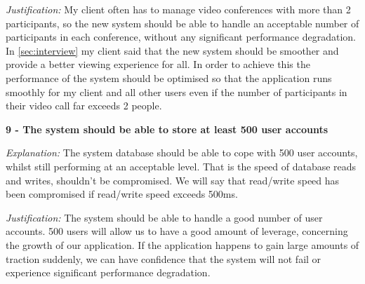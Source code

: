 \textit{Justification:}
My client often has to manage video conferences with more than
2 participants, so the new system should be able to handle an
acceptable number of participants in each conference, without
any significant performance degradation. In
\ref{sec:interview} my client said that the new system
should be smoother and provide a better viewing experience
for all. In order to achieve this the performance of the
system should be optimised so that the application runs
smoothly for my client and all other users even if the
number of participants in their video call far exceeds 2
people.

\vspace{0.2cm}

\textsf{\bfseries 9 - The system should be able to store at
least 500 user accounts}

\vspace{0.1cm}

\textit{Explanation:}
The system database should be able to cope with 500 user
accounts, whilst still performing at an acceptable level.
That is the speed of database reads and writes, shouldn't
be compromised. We will say that read/write speed has been
compromised if read/write speed exceeds 500ms.
\vspace{0.1cm}

\textit{Justification:}
The system should be able to handle a good number of user
accounts. 500 users will allow us to have a good amount of
leverage, concerning the growth of our application. If the
application happens to gain large amounts of traction
suddenly, we can have confidence that the system will not
fail or experience significant performance degradation.
